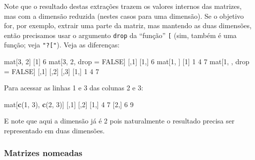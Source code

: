 \documentclass[10pt,a4paper]{book}
\newenvironment{Shaded}{\begin{snugshade}}{\end{snugshade}}
\newcommand{\KeywordTok}[1]{\textcolor[rgb]{0.13,0.29,0.53}{\textbf{#1}}}
\newcommand{\DecValTok}[1]{\textcolor[rgb]{0.00,0.00,0.81}{#1}}
\newcommand{\StringTok}[1]{\textcolor[rgb]{0.31,0.60,0.02}{#1}}
\newcommand{\OtherTok}[1]{\textcolor[rgb]{0.56,0.35,0.01}{#1}}
\newcommand{\NormalTok}[1]{#1}
\begin{document}
Note que o resultado destas extrações trazem os valores internos das
matrizes, mas com a dimensão reduzida (nestes casos para uma dimensão).
Se o objetivo for, por exemplo, extrair uma parte da matriz, mas
mantendo as duas dimensões, então precisamos usar o argumento
\texttt{drop} da ``função'' \texttt{{[}} (sim, também é uma função; veja
\texttt{"?{[}"}). Veja as diferenças:

\begin{Shaded}
\begin{Highlighting}[]
\NormalTok{mat[}\DecValTok{3}\NormalTok{, }\DecValTok{2}\NormalTok{]}
\NormalTok{[}\DecValTok{1}\NormalTok{] }\DecValTok{6}
\NormalTok{mat[}\DecValTok{3}\NormalTok{, }\DecValTok{2}\NormalTok{, drop =}\StringTok{ }\OtherTok{FALSE}\NormalTok{]}
\NormalTok{     [,}\DecValTok{1}\NormalTok{]}
\NormalTok{[}\DecValTok{1}\NormalTok{,]    }\DecValTok{6}
\NormalTok{mat[}\DecValTok{1}\NormalTok{, ]}
\NormalTok{[}\DecValTok{1}\NormalTok{] }\DecValTok{1} \DecValTok{4} \DecValTok{7}
\NormalTok{mat[}\DecValTok{1}\NormalTok{, , drop =}\StringTok{ }\OtherTok{FALSE}\NormalTok{]}
\NormalTok{     [,}\DecValTok{1}\NormalTok{] [,}\DecValTok{2}\NormalTok{] [,}\DecValTok{3}\NormalTok{]}
\NormalTok{[}\DecValTok{1}\NormalTok{,]    }\DecValTok{1}    \DecValTok{4}    \DecValTok{7}
\end{Highlighting}
\end{Shaded}

Para acessar as linhas 1 e 3 das colunas 2 e 3:

\begin{Shaded}
\begin{Highlighting}[]
\NormalTok{mat[}\KeywordTok{c}\NormalTok{(}\DecValTok{1}\NormalTok{, }\DecValTok{3}\NormalTok{), }\KeywordTok{c}\NormalTok{(}\DecValTok{2}\NormalTok{, }\DecValTok{3}\NormalTok{)]}
\NormalTok{     [,}\DecValTok{1}\NormalTok{] [,}\DecValTok{2}\NormalTok{]}
\NormalTok{[}\DecValTok{1}\NormalTok{,]    }\DecValTok{4}    \DecValTok{7}
\NormalTok{[}\DecValTok{2}\NormalTok{,]    }\DecValTok{6}    \DecValTok{9}
\end{Highlighting}
\end{Shaded}

E note que aqui a dimensão já é 2 pois naturalmente o resultado precisa
ser representado em duas dimensões.

\subsubsection{Matrizes nomeadas}\label{matrizes-nomeadas}
\end{document}
